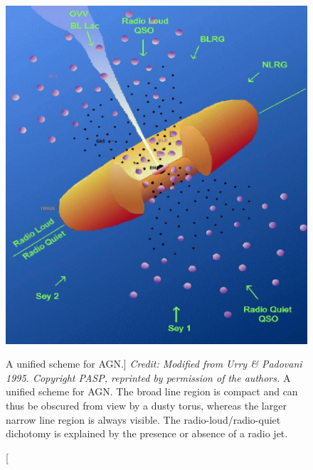 \begin{figure}
\centering
\includegraphics[width=1.0\textwidth]{figures/01-intro/up95.png}
\caption
[A unified scheme for AGN.]
{
{\sl Credit: Modified from 
Urry \& Padovani 1995. Copyright PASP, reprinted by permission of the authors.}
A unified scheme for AGN. The broad line region is compact and can thus
be obscured from view by a dusty torus, whereas the larger narrow line region
is always visible. The radio-loud/radio-quiet dichotomy is explained by
the presence or absence of a radio jet.
} 
\label{fig:unification}
\end{figure} 

